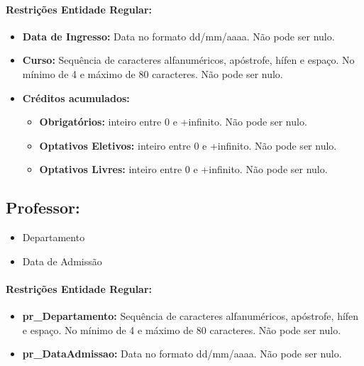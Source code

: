 \documentclass{report}
\begin{document}
\paragraph{Restrições Entidade Regular:}
\begin{itemize}
  \item \textbf{Data de Ingresso:} Data no formato dd/mm/aaaa. Não pode ser nulo.
  \item \textbf{Curso:} Sequência de caracteres alfanuméricos, apóstrofe, hífen e espaço. No mínimo de 4 e máximo de 80 caracteres. Não pode ser nulo.
  \item \textbf{Créditos acumulados:}
  \begin{itemize}
  	\item \textbf{Obrigatórios:} inteiro entre 0 e +infinito. Não pode ser nulo.
  	\item \textbf{Optativos Eletivos:} inteiro entre 0 e +infinito. Não pode ser nulo.
  	\item \textbf{Optativos Livres:} inteiro entre 0 e +infinito. Não pode ser nulo.
  \end{itemize}
\end{itemize}

\subsection{Professor:}
\begin{itemize}
  \item Departamento
  \item Data de Admissão
\end{itemize}
\paragraph{Restrições Entidade Regular:}
\begin{itemize}
  \item \textbf{pr\_Departamento:} Sequência de caracteres alfanuméricos, apóstrofe, hífen e espaço. No mínimo de 4 e máximo de 80 caracteres. Não pode ser nulo.
  \item \textbf{pr\_DataAdmissao:} Data no formato dd/mm/aaaa. Não pode ser nulo.
\end{itemize}
\end{document}
